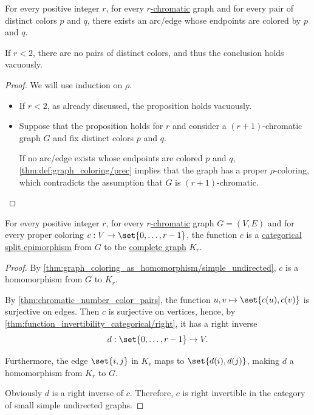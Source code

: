 \begin{proposition}\label{thm:chromatic_number_color_pairs}
  For every positive integer \( r \), for every \hyperref[def:graph_chromatic_number]{\( r \)-chromatic} graph and for every pair of distinct colors \( p \) and \( q \), there exists an arc/edge whose endpoints are colored by \( p \) and \( q \).
\end{proposition}
\begin{comments}
  \item If \( r < 2 \), there are no pairs of distinct colors, and thus the conclusion holds vacuously.
\end{comments}
\begin{proof}
  We will use induction on \( \rho \).
  \begin{itemize}
    \item If \( r < 2 \), as already discussed, the proposition holds vacuously.

    \item Suppose that the proposition holds for \( r \) and consider a \( (r + 1) \)-chromatic graph \( G \) and fix distinct colors \( p \) and \( q \).

    If no arc/edge exists whose endpoints are colored \( p \) and \( q \), \cref{thm:def:graph_coloring/prec} implies that the graph has a proper \( \rho \)-coloring, which contradicts the assumption that \( G \) is \( (r + 1) \)-chromatic.
  \end{itemize}
\end{proof}

\begin{corollary}\label{thm:chromatic_number_coloring_splits}
  For every positive integer \( r \), for every \hyperref[def:graph_chromatic_number]{\( r \)-chromatic} graph \( G = (V, E) \) and for every proper coloring \( c: V \to \set{ 0, \ldots, r - 1 } \), the function \( c \) is a \hyperref[def:morphism_cancellation/right]{categorical split epimorphism} from \( G \) to the \hyperref[def:complete_graph]{complete graph} \( K_r \).
\end{corollary}
\begin{proof}
  By \cref{thm:graph_coloring_as_homomorphism/simple_undirected}, \( c \) is a homomorphism from \( G \) to \( K_r \).

  By \cref{thm:chromatic_number_color_pairs}, the function \( { u, v } \mapsto \set{ c(u), c(v) } \) is surjective on edges. Then \( c \) is surjective on vertices, hence, by \cref{thm:function_invertibility_categorical/right}, it has a right inverse
  \begin{equation*}
    d: \set{ 0, \ldots, r - 1 } \to V.
  \end{equation*}

  Furthermore, the edge \( \set{ i, j } \) in \( K_r \) maps to \( \set{ d(i), d(j) } \), making \( d \) a homomorphism from \( K_r \) to \( G \).

  Obviously \( d \) is a right inverse of \( c \). Therefore, \( c \) is right invertible in the category of small simple undirected graphs.
\end{proof}

